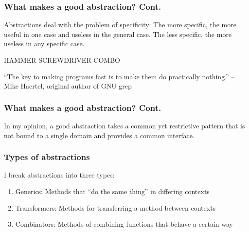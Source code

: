 \documentclass{beamer}
\begin{document}
\begin{frame}
  \frametitle{What makes a good abstraction? Cont.}



  Abstractions deal with the problem of specificity:
  The more specific, the more useful in one case and useless in the general case.
  The less specific, the more useless in any specific case.

  HAMMER SCREWDRIVER COMBO

  ``The key to making programs fast is to make them do practically nothing.'' -- Mike Haertel, original author of GNU grep

\end{frame}


\begin{frame}
  \frametitle{What makes a good abstraction? Cont.}

  In my opinion, a good abstraction takes a common yet restrictive pattern that is not bound to a single domain and provides a common interface. \\


\end{frame}


\begin{frame}
  \frametitle{Types of abstractions}

  I break abstractions into three types:

  \begin{enumerate}
    \item Generics: Methods that ``do the same thing'' in differing contexts
    \item Transformers: Methods for transferring a method between contexts
    \item Combinators: Methods of combining functions that behave a certain way
  \end{enumerate}

\end{frame}
\end{document}
